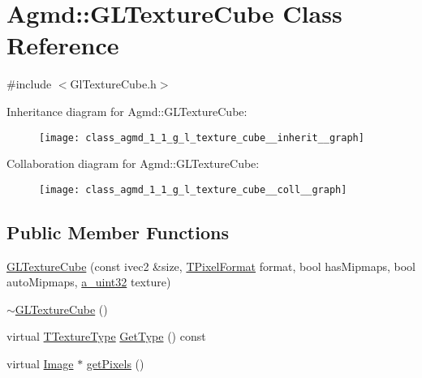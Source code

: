 \hypertarget{class_agmd_1_1_g_l_texture_cube}{\section{Agmd\+:\+:G\+L\+Texture\+Cube Class Reference}
\label{class_agmd_1_1_g_l_texture_cube}
}


{\ttfamily \#include $<$Gl\+Texture\+Cube.\+h$>$}



Inheritance diagram for Agmd\+:\+:G\+L\+Texture\+Cube\+:\nopagebreak
\begin{figure}[H]
\begin{center}
\leavevmode
\texttt{[image: class\_agmd\_1\_1\_g\_l\_texture\_cube\_\_inherit\_\_graph]}
\end{center}
\end{figure}


Collaboration diagram for Agmd\+:\+:G\+L\+Texture\+Cube\+:\nopagebreak
\begin{figure}[H]
\begin{center}
\leavevmode
\texttt{[image: class\_agmd\_1\_1\_g\_l\_texture\_cube\_\_coll\_\_graph]}
\end{center}
\end{figure}
\subsection*{Public Member Functions}
\begin{DoxyCompactItemize}
\item 
\hyperlink{class_agmd_1_1_g_l_texture_cube_a7abdec6655f67911cfa5ef51c2e79c4e}{G\+L\+Texture\+Cube} (const ivec2 \&size, \hyperlink{namespace_agmd_afc48fd9fa5dccb4c5621c052bfd1a7ec}{T\+Pixel\+Format} format, bool has\+Mipmaps, bool auto\+Mipmaps, \hyperlink{_common_defines_8h_a964296f9770051b9e4807b1f180dd416}{a\+\_\+uint32} texture)
\item 
\hyperlink{class_agmd_1_1_g_l_texture_cube_ab2af9fc617826d9bcfd7e21a1061989a}{$\sim$\+G\+L\+Texture\+Cube} ()
\item 
virtual \hyperlink{namespace_agmd_a7036bece09449a930cfec410f75e85f4}{T\+Texture\+Type} \hyperlink{class_agmd_1_1_g_l_texture_cube_ad159f601e39b7a31b24b971680134375}{Get\+Type} () const 
\item 
virtual \hyperlink{class_agmd_1_1_image}{Image} $\ast$ \hyperlink{class_agmd_1_1_g_l_texture_cube_aa1a1ef3de3f5acdf74335abef75d5747}{get\+Pixels} ()
\end{DoxyCompactItemize}
